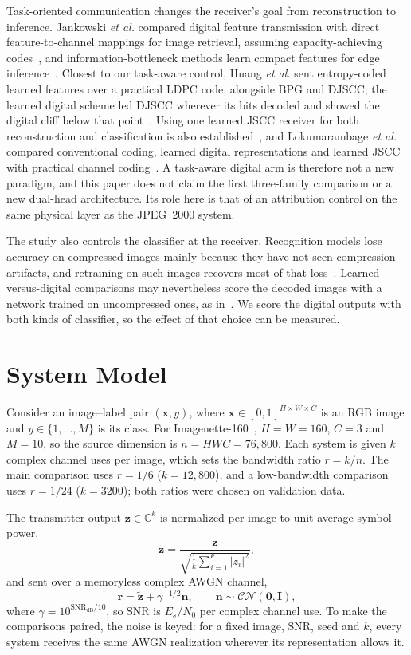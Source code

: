 \documentclass[conference]{IEEEtran}
\begin{document}
Task-oriented communication changes the receiver's goal from reconstruction to inference. Jankowski \emph{et al.} compared digital feature transmission with direct feature-to-channel mappings for image retrieval, assuming capacity-achieving codes~\cite{jankowski2021}, and information-bottleneck methods learn compact features for edge inference~\cite{shao2022}. Closest to our task-aware control, Huang \emph{et al.} sent entropy-coded learned features over a practical LDPC code, alongside BPG and DJSCC; the learned digital scheme led DJSCC wherever its bits decoded and showed the digital cliff below that point~\cite{huang2024}. Using one learned JSCC receiver for both reconstruction and classification is also established~\cite{lyu2024}, and Lokumarambage \emph{et al.} compared conventional coding, learned digital representations and learned JSCC with practical channel coding~\cite{lokumarambage2026}. A task-aware digital arm is therefore not a new paradigm, and this paper does not claim the first three-family comparison or a new dual-head architecture. Its role here is that of an attribution control on the same physical layer as the JPEG~2000 system.

The study also controls the classifier at the receiver. Recognition models lose accuracy on compressed images mainly because they have not seen compression artifacts, and retraining on such images recovers most of that loss~\cite{janeiro2023}. Learned-versus-digital comparisons may nevertheless score the decoded images with a network trained on uncompressed ones, as in~\cite{huang2024}. We score the digital outputs with both kinds of classifier, so the effect of that choice can be measured.

\section{System Model}
Consider an image--label pair $(\mathbf{x},y)$, where $\mathbf{x}\in[0,1]^{H\times W\times C}$ is an RGB image and $y\in\{1,\ldots,M\}$ is its class. For Imagenette-160~\cite{imagenette}, $H=W=160$, $C=3$ and $M=10$, so the source dimension is $n=HWC=76{,}800$. Each system is given $k$ complex channel uses per image, which sets the bandwidth ratio $r=k/n$. The main comparison uses $r=1/6$ ($k=12{,}800$), and a low-bandwidth comparison uses $r=1/24$ ($k=3200$); both ratios were chosen on validation data.

The transmitter output $\mathbf{z}\in\mathbb{C}^{k}$ is normalized per image to unit average symbol power,
\begin{equation}
 \tilde{\mathbf{z}}=\frac{\mathbf{z}}{\sqrt{\frac{1}{k}\sum_{i=1}^{k}|z_i|^2}},
\end{equation}
and sent over a memoryless complex AWGN channel,
\begin{equation}
 \mathbf{r}=\tilde{\mathbf{z}}+\gamma^{-1/2}\mathbf{n},
 \qquad \mathbf{n}\sim\mathcal{CN}(\mathbf{0},\mathbf{I}),
\end{equation}
where $\gamma=10^{\mathrm{SNR}_{\mathrm{dB}}/10}$, so SNR is $E_s/N_0$ per complex channel use. To make the comparisons paired, the noise is keyed: for a fixed image, SNR, seed and $k$, every system receives the same AWGN realization wherever its representation allows it.
\end{document}
